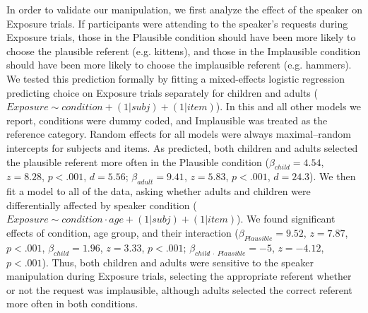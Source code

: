 \documentclass[man,floatsintext]{apa6}
\begin{document}
In order to validate our manipulation, we first analyze the effect of the speaker on Exposure trials. If participants were attending to the speaker's requests during Exposure trials, those in the Plausible condition should have been more likely to choose the plausible referent (e.g. kittens), and those in the Implausible condition should have been more likely to choose the implausible referent (e.g. hammers). We tested this prediction formally by fitting a mixed-effects logistic regression predicting choice on Exposure trials separately for children and adults ($Exposure \sim condition + (1|subj) + (1|item)$). In this and all other models we report, conditions were dummy coded, and Implausible was treated as the reference category. Random effects for all models were always maximal--random intercepts for subjects and items. As predicted, both children and adults selected the plausible referent more often in the Plausible condition ($\beta_{child} = 4.54$,  $z = 8.28$, $p <.001$, $d = 5.56$; $\beta_{adult} = 9.41$,  $z = 5.83$, $p <.001$, $d = 24.3$). We then fit a model to all of the data, asking whether adults and children were differentially affected by speaker condition ($Exposure \sim condition \cdot age + (1|subj) + (1|item)$). We found significant effects of condition, age group, and their interaction ($\beta_{Plausible} = 9.52$,  $z = 7.87$, $p <.001$,  $\beta_{child} = 1.96$,  $z = 3.33$, $p <.001$; $\beta_{child\: \cdot \: Plausible} = -5$,  $z = -4.12$, $p <.001$). Thus, both children and adults were sensitive to the speaker manipulation during Exposure trials, selecting the appropriate referent whether or not the request was implausible, although adults selected the correct referent more often in both conditions.
\end{document}
